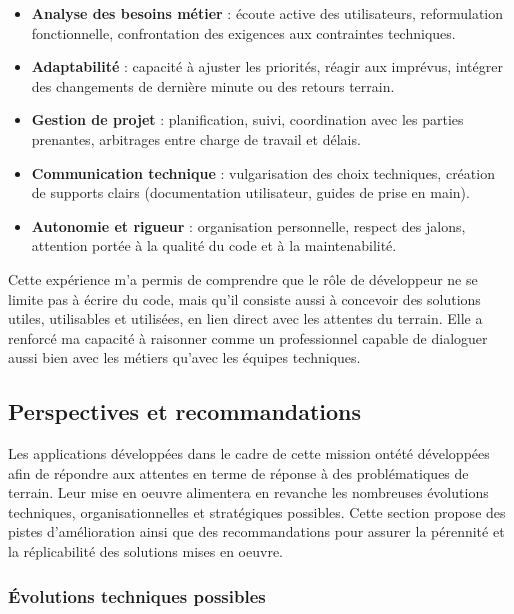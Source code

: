 \documentclass[11pt,a4paper]{article}
\begin{document}
\begin{itemize}
    \item \textbf{Analyse des besoins métier} : écoute active des utilisateurs, reformulation fonctionnelle, confrontation des exigences aux contraintes techniques.

    \item \textbf{Adaptabilité} : capacité à ajuster les priorités, réagir aux imprévus, intégrer des changements de dernière minute ou des retours terrain.

    \item \textbf{Gestion de projet} : planification, suivi, coordination avec les parties prenantes, arbitrages entre charge de travail et délais.

    \item \textbf{Communication technique} : vulgarisation des choix techniques, création de supports clairs (documentation utilisateur, guides de prise en main).

    \item \textbf{Autonomie et rigueur} : organisation personnelle, respect des jalons, attention portée à la qualité du code et à la maintenabilité.
\end{itemize}

Cette expérience m’a permis de comprendre que le rôle de développeur ne se limite pas à écrire du code, mais qu’il consiste aussi à concevoir des solutions utiles, utilisables et utilisées, en lien direct avec les attentes du terrain. Elle a renforcé ma capacité à raisonner comme un professionnel capable de dialoguer aussi bien avec les métiers qu’avec les équipes techniques.


\subsection{Perspectives et recommandations}

Les applications développées dans le cadre de cette mission ontété développées afin de répondre aux attentes en terme de réponse à des problématiques de terrain. Leur mise en oeuvre alimentera en revanche les nombreuses évolutions techniques, organisationnelles et stratégiques possibles. Cette section propose des pistes d’amélioration ainsi que des recommandations pour assurer la pérennité et la réplicabilité des solutions mises en oeuvre. 

\subsubsection{Évolutions techniques possibles}
\end{document}
